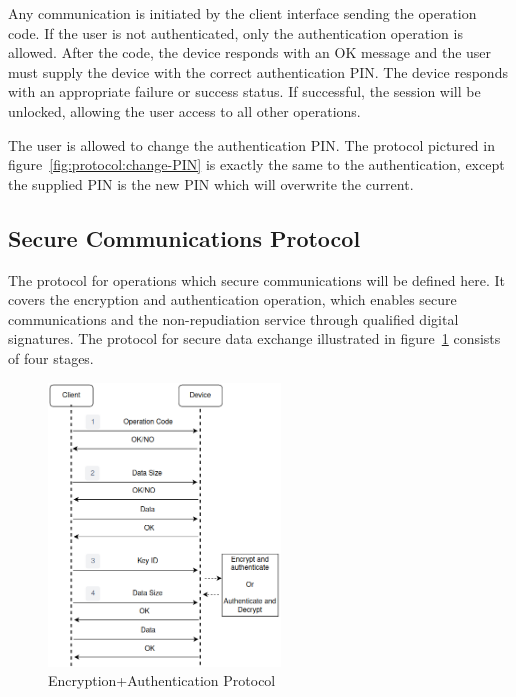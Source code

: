 Any communication is initiated by the client interface sending the operation code.
If the user is not authenticated, only the authentication operation is allowed.
After the code, the device responds with an OK message and the user must supply the device with the correct authentication \ac{PIN}.
The device responds with an appropriate failure or success status. If successful, the session will be unlocked, allowing the user access to all other operations.

The user is allowed to change the authentication \ac{PIN}. The protocol pictured in figure~\ref{fig:protocol:change-PIN} is exactly the same to the authentication, except the supplied \ac{PIN} is the new \ac{PIN} which will overwrite the current.

\subsection{Secure Communications Protocol}\label{chap:implementation:protocol:comms}

The protocol for operations which secure communications will be defined here. It covers the encryption and authentication operation, which enables secure communications and the non-repudiation service through qualified digital signatures.
The protocol for secure data exchange illustrated in figure~\ref{fig:protocol:data-exchange} consists of four stages.

\begin{figure}[h!]
	\centering
	\includegraphics[width=0.55\textwidth]{./Images/data-exchange.png}
	\caption{Encryption+Authentication Protocol}
	\label{fig:protocol:data-exchange}
\end{figure}

